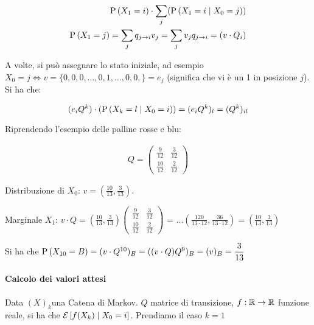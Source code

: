 \begin{equation*}
	\begin{aligned}
	\text{P}\left(X_1 = i\right) \cdot \sum_j (\text{P}\left(X_1 = i \mid X_0 = j\right)) \\
	\text{P}\left(X_1 = j\right) = \sum_j q_{j \to i} v_j = \sum_j v_j q_{j \to i} = (v \cdot Q_i)
	\end{aligned}
\end{equation*}


A volte, si può assegnare lo stato iniziale, ad esempio $ X_0 = j \iff v = \{0, 0, 0, \hdots, 0, 1, \hdots, 0, 0,\} = e_j $ (significa che vi è un 1 in posizione $ j $). Si ha che:

\begin{equation*}
(e_i Q^k) \cdot (\text{P}\left(X_k = l \mid X_0 = i\right) ) = (e_i Q^k)_l = (Q^k)_{il}
\end{equation*}

\begin{exmp}
	Riprendendo l'esempio delle palline rosse e blu:
	
	\begin{equation*}
	\begin{aligned}
	Q=\begin{pmatrix}
	\frac{9}{12} & \frac{3}{12} \\
	\frac{10}{12} & \frac{2}{12}
	\end{pmatrix}
	\end{aligned}
	\end{equation*}
	
	Distribuzione di $ X_0 $: $ v = (\frac{10}{13}, \frac{3}{13}) $.
	
	Marginale $ X_1 $: $ v \cdot Q = (\frac{10}{13}, \frac{3}{13})\begin{pmatrix}
	\frac{9}{12} & \frac{3}{12} \\
	\frac{10}{12} & \frac{2}{12}
	\end{pmatrix} $ = $\hdots (\frac{120}{13 \cdot 12}, \frac{36}{13 \cdot 12}) = \left( \frac{10}{13}, \frac{3}{13} \right)$
	
	Si ha che $ \text{P}\left(X_{10} = B\right) = (v \cdot Q^{10})_B = ((v \cdot Q) Q^9)_B = (v)_B = {\dfrac{3}{13}} $
	
\end{exmp}

\paragraph{Calcolo dei valori attesi}

Data $ (X)_k $una Catena di Markov. $ Q $ matrice di transizione, $ f : \mathbb{R} \to \mathbb{R}$ funzione reale, si ha che $ \mathcal{E}\left[f(X_k) \mid X_0 = i\right] $. Prendiamo il caso $ k = 1 $

